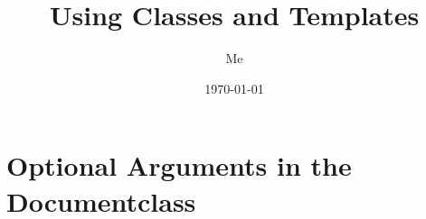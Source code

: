 \documentclass[12pt,titlepage]{article}
\title{Using Classes and Templates}
\author{Me}
\date{\today}
\begin{document}
\maketitle

\newpage
\thispagestyle{empty}
\tableofcontents
\newpage

\section{Optional Arguments in the Documentclass}
\end{document}
